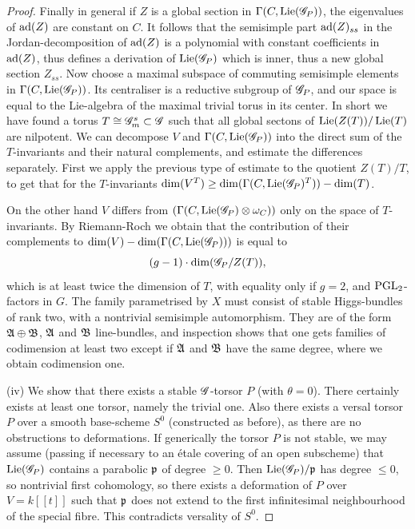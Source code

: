 \documentclass[12pt,english]{smfart}
\theoremstyle{plain} \newtheorem{innerthm}{Theorem} \newtheorem{innerlem}{Lemma} \newtheorem{innerprop}{Proposition} \newtheorem{innercor}{Corollary} \theoremstyle{definition} \newtheorem{innerdefn}{Definition} \newtheorem{innerconstr}{Construction} \theoremstyle{remark} \newtheorem*{remark}{Remark} \newtheorem*{remarks}{Remarks} \newtheorem*{applications}{Applications}
\begin{document}
\begin{proof}
Finally in general if $Z$ is a global section in $\Gamma(C,\operatorname{Lie}(\mathscr{G}_P))$, the eigenvalues of $\operatorname{ad}(Z)$ are constant on $C$. It follows that the semisimple part $\operatorname{ad}(Z)_{ss}$ in the Jordan-decomposition of $\operatorname{ad}(Z)$ is a polynomial with constant coefficients in $\operatorname{ad}(Z)$, thus defines a derivation of $\operatorname{Lie}(\mathscr{G}_P)$ which is inner, thus a new global section $Z_{ss}$. Now choose a maximal subspace of commuting semisimple elements in $\Gamma(C,\operatorname{Lie}(\mathscr{G}_P))$. Its centraliser is a reductive subgroup of $\mathscr{G}_P$, and our space is equal to the Lie-algebra of the maximal trivial torus in its center. In short we have found a torus $T\cong\mathscr{G}_m^s\subset\mathscr{G}$ such that all global sectons of $\operatorname{Lie}(Z(T))/\operatorname{Lie}(T)$ are nilpotent. We can decompose $V$ and $\Gamma(C,\operatorname{Lie}(\mathscr{G}_P))$ into the direct sum of the $T$-invariants and their natural complements, and estimate the differences separately. First we apply the previous type of estimate to the quotient $Z(T)/T$, to get that for the $T$-invariants $\dim(V^T)\ge\dim(\Gamma(C,\operatorname{Lie}(\mathscr{G}_P)^T))-\dim(T)$.

On the other hand $V$ differs from $(\Gamma(C,\operatorname{Lie}(\mathscr{G}_P)\otimes\omega_C))$ only on the space of $T$-invariants. By Riemann-Roch we obtain that the contribution of their complements to $\dim(V)-\dim(\Gamma(C,\operatorname{Lie}(\mathscr{G}_P)))$ is equal to
\[
(g-1)\cdot\dim(\mathscr{G}_P/Z(T)),
\]
which is at least twice the dimension of $T$, with equality only if $g=2$, and $\operatorname{PGL}_2$-factors in $G$. The family parametrised by $X$ must consist of stable Higgs-bundles of rank two, with a nontrivial semisimple automorphism. They are of the form $\mathfrak{A}\oplus\mathfrak{B}$, $\mathfrak{A}$ and $\mathfrak{B}$ line-bundles, and inspection shows that one gets families of codimension at least two except if $\mathfrak{A}$ and $\mathfrak{B}$ have the same degree, where we obtain codimension one.

(iv) We show that there exists a stable $\mathscr{G}$-torsor $P$ (with $\theta=0$). There certainly exists at least one torsor, namely the trivial one. Also there exists
a versal torsor $P$ over a smooth base-scheme $S^0$ (constructed as before), as there are no obstructions to deformations. If generically the torsor $P$ is not stable, we may assume (passing if necessary to an \'etale covering of an open subscheme) that $\operatorname{Lie}(\mathscr{G}_P)$ contains a parabolic $\mathfrak{p}$ of degree $\ge 0$. Then $\operatorname{Lie}(\mathscr{G}_P)/\mathfrak{p}$ has degree $\le 0$, so nontrivial first cohomology, so there exists a deformation of $P$ over $V=k[\![t]\!]$ such that $\mathfrak{p}$ does not extend to the first infinitesimal neighbourhood of the special fibre. This contradicts versality of $S^0$.
\end{proof}
\end{document}
